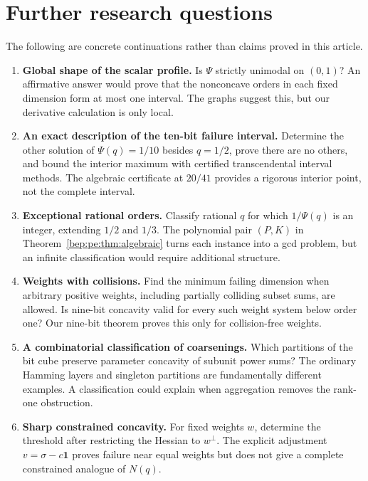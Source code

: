 \documentclass[11pt]{article}
\numberwithin{equation}{section}
\theoremstyle{definition}
\theoremstyle{remark}
\newcommand{\one}{\boldsymbol 1}
\begin{document}
\section{Further research questions}\label{bep:pe:sec:questions}
The following are concrete continuations rather than claims proved in
this article.
\begin{enumerate}[label=\textbf{Q\arabic*.},leftmargin=3.2em]
\item \textbf{Global shape of the scalar profile.}
Is $\Psi$ strictly unimodal on $(0,1)$? An affirmative answer would
prove that the nonconcave orders in each fixed dimension form at most
one interval. The graphs suggest this, but our derivative calculation
is only local.

\item \textbf{An exact description of the ten-bit failure interval.}
Determine the other solution of $\Psi(q)=1/10$ besides $q=1/2$, prove
there are no others, and bound the interior maximum with certified
transcendental interval methods. The algebraic certificate at $20/41$
provides a rigorous interior point, not the complete interval.

\item \textbf{Exceptional rational orders.}
Classify rational $q$ for which $1/\Psi(q)$ is an integer, extending
$1/2$ and $1/3$. The polynomial pair $(P,K)$ in
Theorem~\ref{bep:pe:thm:algebraic} turns each instance into a gcd problem, but
an infinite classification would require additional structure.

\item \textbf{Weights with collisions.}
Find the minimum failing dimension when arbitrary positive weights,
including partially colliding subset sums, are allowed. Is nine-bit
concavity valid for every such weight system below order one? Our
nine-bit theorem proves this only for collision-free weights.

\item \textbf{A combinatorial classification of coarsenings.}
Which partitions of the bit cube preserve parameter concavity of
subunit power sums? The ordinary Hamming layers and singleton
partitions are fundamentally different examples. A classification
could explain when aggregation removes the rank-one obstruction.

\item \textbf{Sharp constrained concavity.}
For fixed weights $w$, determine the threshold after restricting the
Hessian to $w^\perp$. The explicit adjustment
$v=\sigma-c\one$ proves failure near equal weights but does not give a
complete constrained analogue of $N(q)$.


\end{enumerate}
\end{document}
